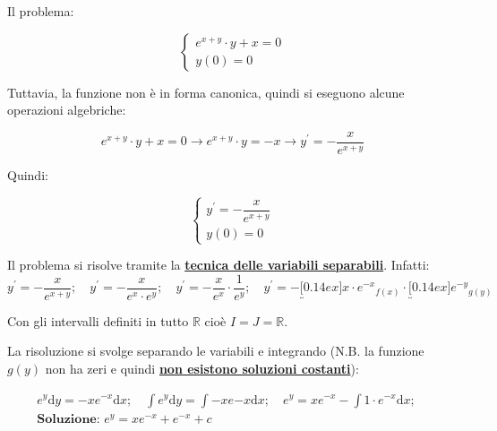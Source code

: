 \documentclass[a4paper]{article}
\begin{document}
	\noindent
	Il problema:
	
	\begin{equation*}
		\begin{cases}
			e^{x+y} \cdot y + x = 0 \\
			y\left(0\right) = 0
		\end{cases}
	\end{equation*}
	
	\noindent
	Tuttavia, la funzione non è in forma canonica, quindi si eseguono alcune operazioni algebriche:
	
	\begin{equation*}
		e^{x+y} \cdot y + x = 0 \longrightarrow e^{x+y} \cdot y = -x \longrightarrow y^{'} = - \dfrac{x}{e^{x+y}}
	\end{equation*}

	\noindent
	Quindi:
	
	\begin{equation*}
		\begin{cases}
			y^{'} = - \dfrac{x}{e^{x+y}} \\
			y\left(0\right) = 0
		\end{cases}
	\end{equation*}

	\noindent
	Il problema si risolve tramite la \textbf{\underline{tecnica delle variabili separabili}}. Infatti:
	\begin{equation*}
		y^{'} = -\dfrac{x}{e^{x+y}}; \hspace{1em}
		y^{'} = -\dfrac{x}{e^{x} \cdot e^{y}}; \hspace{1em}
		y^{'} = -\dfrac{x}{e^{x}} \cdot \dfrac{1}{e^{y}}; \hspace{1em}
		y^{'} = - \underbracket[0.14ex]{x \cdot e^{-x}}_{f\left(x\right)} \cdot \underbracket[0.14ex]{e^{-y}}_{g\left(y\right)}
	\end{equation*}

	\noindent
	Con gli intervalli definiti in tutto $\mathbb{R}$ cioè $I = J = \mathbb{R}$.
	
	\noindent
	La risoluzione si svolge separando le variabili e integrando (N.B. la funzione $g\left(y\right)$ non ha zeri e quindi \textbf{\underline{non esistono soluzioni costanti}}):
	
	\begin{gather*}
		e^{y} \mathrm{d}y = -x e^{-x} \mathrm{d}x; \hspace{1em}
		\int e^{y} \mathrm{d}y = \int -x e{-x} \mathrm{d}x; \hspace{1em}
		e^{y} = x e^{-x} - \int 1 \cdot e^{-x} \mathrm{d}x; \hspace{1em} \\
		\textbf{Soluzione: } e^{y} = x e^{-x} + e^{-x} + c
	\end{gather*}
\end{document}
